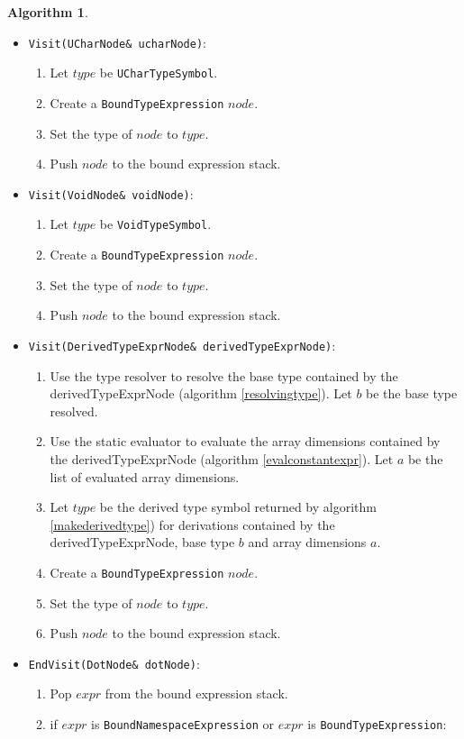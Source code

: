 \documentclass[a4paper,oneside,11pt]{book}
\theoremstyle{definition}
\newtheorem{algo}{Algorithm}[section]
\begin{document}
\begin{algo}
\begin{itemize}
\item
\verb|Visit(UCharNode& ucharNode)|:
\begin{enumerate}
\item
Let $type$ be \verb|UCharTypeSymbol|.
\item
Create a \verb|BoundTypeExpression| $node$.
\item
Set the type of $node$ to $type$.
\item
Push $node$ to the bound expression stack.
\end{enumerate}
\item
\verb|Visit(VoidNode& voidNode)|:
\begin{enumerate}
\item
Let $type$ be \verb|VoidTypeSymbol|.
\item
Create a \verb|BoundTypeExpression| $node$.
\item
Set the type of $node$ to $type$.
\item
Push $node$ to the bound expression stack.
\end{enumerate}
\item
\verb|Visit(DerivedTypeExprNode& derivedTypeExprNode)|:
\begin{enumerate}
\item
Use the type resolver to resolve the base type contained by the derivedTypeExprNode (algorithm \ref{resolvingtype}). Let $b$ be the base type resolved.
\item
Use the static evaluator to evaluate the array dimensions contained by the derivedTypeExprNode (algorithm \ref{evalconstantexpr}).
Let $a$ be the list of evaluated array dimensions.
\item
Let $type$ be the derived type symbol returned by algorithm \ref{makederivedtype}) for derivations contained by the derivedTypeExprNode, base type $b$ and
array dimensions $a$.
\item
Create a \verb|BoundTypeExpression| $node$.
\item
Set the type of $node$ to $type$.
\item
Push $node$ to the bound expression stack.
\end{enumerate}
\item
\verb|EndVisit(DotNode& dotNode)|:\\
\begin{enumerate}
\item
Pop $expr$ from the bound expression stack.
\item
if $expr$ is \verb|BoundNamespaceExpression| or $expr$ is \verb|BoundTypeExpression|:

\end{enumerate}
\end{itemize}
\end{algo}
\end{document}
